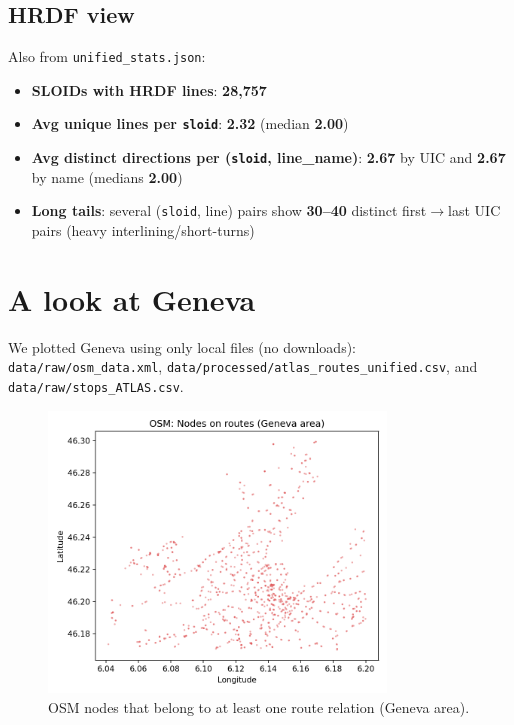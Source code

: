 \subsection*{HRDF view}
Also from \texttt{unified\_stats.json}:
\begin{itemize}
  \item \textbf{SLOIDs with HRDF lines}: \textbf{28,757}
  \item \textbf{Avg unique lines per \texttt{sloid}}: \textbf{2.32} (median \textbf{2.00})
  \item \textbf{Avg distinct directions per (\texttt{sloid}, line\_name)}: \textbf{2.67} by UIC and \textbf{2.67} by name (medians \textbf{2.00})
  \item \textbf{Long tails}: several (\texttt{sloid}, line) pairs show \textbf{30–40} distinct first$\rightarrow$last UIC pairs (heavy interlining/short-turns)
\end{itemize}

\section{A look at Geneva}
We plotted Geneva using only local files (no downloads): \texttt{data/raw/osm\_data.xml}, \texttt{data/processed/atlas\_routes\_unified.csv}, and \texttt{data/raw/stops\_ATLAS.csv}.

\begin{figure}[H]
  \centering
  \includegraphics[width=0.8\textwidth]{../figures/chap4/geneva_osm_routes_nodes.png}
  \caption{OSM nodes that belong to at least one route relation (Geneva area).}
\end{figure}

